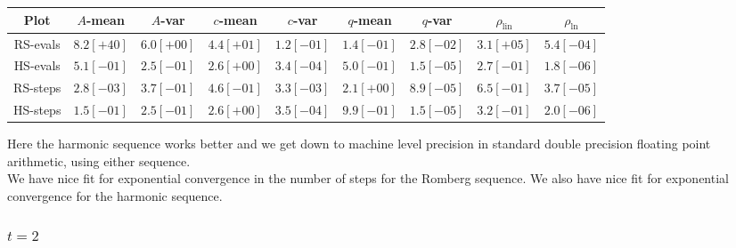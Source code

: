 \begin{table}[H]
    \centering
    \small
    \begin{tabular}{c||c|c|c|c|c|c|c|c}
Plot & \(A\)-mean & \(A\)-var & \(c\)-mean & \(c\)-var & \(q\)-mean & \(q\)-var & \(\rho_{\operatorname{lin}}\) & \(\rho_{\ln}\)\\\hline
\rowcolor{red}
RS-evals & \(8.2[+40]\) & \(6.0[+00]\) & \(4.4[+01]\) & \(1.2[-01]\) & \(1.4[-01]\) & \(2.8[-02]\) & \(3.1[+05]\) & \(5.4[-04]\) \\
\rowcolor{green}
HS-evals & \(5.1[-01]\) & \(2.5[-01]\) & \(2.6[+00]\) & \(3.4[-04]\) & \(5.0[-01]\) & \(1.5[-05]\) & \(2.7[-01]\) & \(1.8[-06]\) \\
\rowcolor{green}
RS-steps & \(2.8[-03]\) & \(3.7[-01]\) & \(4.6[-01]\) & \(3.3[-03]\) & \(2.1[+00]\) & \(8.9[-05]\) & \(6.5[-01]\) & \(3.7[-05]\) \\
\rowcolor{green}
HS-steps & \(1.5[-01]\) & \(2.5[-01]\) & \(2.6[+00]\) & \(3.5[-04]\) & \(9.9[-01]\) & \(1.5[-05]\) & \(3.2[-01]\) & \(2.0[-06]\) \\
    \end{tabular}
    \label{tab:my_label}
\end{table}

Here the harmonic sequence works better and we get down to machine level precision in standard double precision floating point arithmetic, using either sequence.\\

We have nice fit for exponential convergence in the number of steps for the Romberg sequence. We also have nice fit for exponential convergence for the harmonic sequence.

\subsubsection{\(t = 2\)}

